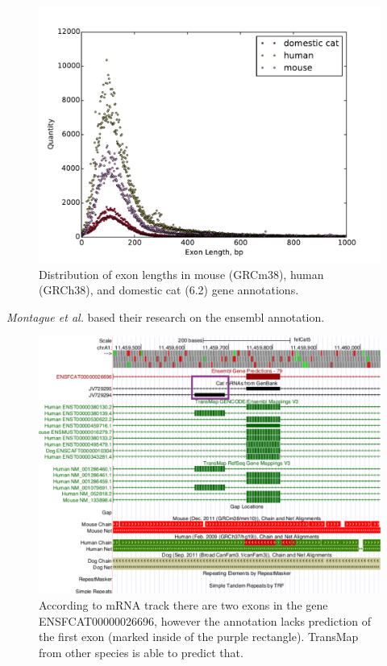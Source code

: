 \documentclass{article}
\begin{document}
\begin{figure}[h]
\centering
\includegraphics[width=\textwidth]{images/exon_distr_human_mouse_cat.pdf}
\caption{Distribution of exon lengths in mouse (GRCm38), human (GRCh38), and domestic cat (6.2) gene annotations.}
\label{fig:human_mouse_cat_exons}
\end{figure}

\textit{Montague et al.} based their research on the ensembl annotation.


\begin{figure}[h]
\centering
\includegraphics[width=\textwidth]{images/hgt_hgwdev_e926_52a620_edit.pdf}
\caption{According to mRNA track there are two exons in the gene ENSFCAT00000026696, however the annotation lacks prediction of the first exon (marked inside of the purple rectangle). TransMap from other species is able to predict that.}
\label{fig:missed_exons_mrna_1}
\end{figure}
\end{document}
